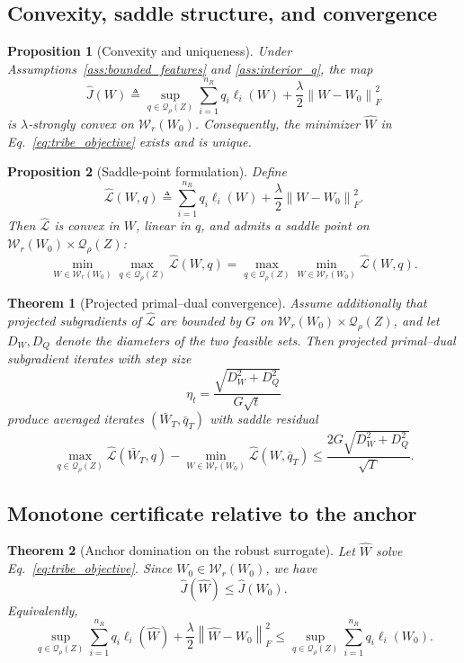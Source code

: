 \documentclass{article}
\newtheorem{theorem}{Theorem}
\newtheorem{proposition}{Proposition}
\newcommand{\cQ}{\mathcal{Q}}
\newcommand{\cW}{\mathcal{W}}
\newcommand{\1}{\mathbbm{1}}
\newcommand{\norm}[1]{\left\lVert #1 \right\rVert}
\newcommand{\loss}{\ell}
\begin{document}
\subsection{Convexity, saddle structure, and convergence}

\begin{proposition}[Convexity and uniqueness]
\label{prop:convexity}
Under Assumptions~\ref{ass:bounded_features} and \ref{ass:interior_q}, the map
\[
    \widehat J(W)
    \triangleq
    \sup_{q\in\cQ_\rho(Z)}
    \sum_{i=1}^{n_R} q_i \loss_i(W)
    +
    \frac{\lambda}{2}\norm{W-W_0}_F^2
\]
is \(\lambda\)-strongly convex on \(\cW_r(W_0)\). Consequently, the minimizer \(\widehat W\) in Eq.~\eqref{eq:tribe_objective} exists and is unique.
\end{proposition}

\begin{proposition}[Saddle-point formulation]
\label{prop:saddle}
Define
\[
    \widehat{\mathcal L}(W,q)
    \triangleq
    \sum_{i=1}^{n_R} q_i \loss_i(W)
    +
    \frac{\lambda}{2}\norm{W-W_0}_F^2.
\]
Then \(\widehat{\mathcal L}\) is convex in \(W\), linear in \(q\), and admits a saddle point on \(\cW_r(W_0)\times \cQ_\rho(Z)\):
\[
    \min_{W\in\cW_r(W_0)} \max_{q\in\cQ_\rho(Z)} \widehat{\mathcal L}(W,q)
    =
    \max_{q\in\cQ_\rho(Z)} \min_{W\in\cW_r(W_0)} \widehat{\mathcal L}(W,q).
\]
\end{proposition}

\begin{theorem}[Projected primal--dual convergence]
\label{thm:convergence}
Assume additionally that projected subgradients of \(\widehat{\mathcal L}\) are bounded by \(G\) on \(\cW_r(W_0)\times \cQ_\rho(Z)\), and let \(D_W,D_Q\) denote the diameters of the two feasible sets. Then projected primal--dual subgradient iterates with step size
\[
    \eta_t = \frac{\sqrt{D_W^2 + D_Q^2}}{G\sqrt{t}}
\]
produce averaged iterates \((\bar W_T,\bar q_T)\) with saddle residual
\[
    \max_{q\in\cQ_\rho(Z)} \widehat{\mathcal L}(\bar W_T,q)
    -
    \min_{W\in\cW_r(W_0)} \widehat{\mathcal L}(W,\bar q_T)
    \le
    \frac{2G\sqrt{D_W^2+D_Q^2}}{\sqrt{T}}.
\]
\end{theorem}

\subsection{Monotone certificate relative to the anchor}

\begin{theorem}[Anchor domination on the robust surrogate]
\label{thm:anchor_domination}
Let \(\widehat W\) solve Eq.~\eqref{eq:tribe_objective}. Since \(W_0 \in \cW_r(W_0)\), we have
\[
    \widehat J(\widehat W) \le \widehat J(W_0).
\]
Equivalently,
\[
    \sup_{q\in\cQ_\rho(Z)} \sum_{i=1}^{n_R} q_i \loss_i(\widehat W)
    +
    \frac{\lambda}{2}\norm{\widehat W-W_0}_F^2
    \le
    \sup_{q\in\cQ_\rho(Z)} \sum_{i=1}^{n_R} q_i \loss_i(W_0).
\]
\end{theorem}
\end{document}
